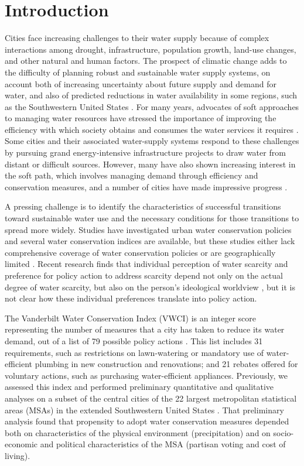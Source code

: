 \documentclass[draft,linenumbers]{agujournal}\usepackage{knitr}
\begin{document}
\section{Introduction}
Cities face increasing challenges to their water supply because of complex
interactions among drought, infrastructure, population growth, land-use changes,
and other natural and human factors.
The prospect of climatic change adds to the difficulty of planning robust and
sustainable water supply systems, on account both of  increasing uncertainty
about future supply and demand for water, and also of predicted reductions in
water availability in some regions, such as the Southwestern United States
\citep{gcrp:natl.assessment.3:2014}.
For many years, advocates of soft approaches to managing water resources have
stressed the importance of improving  the efficiency with which society obtains
and consumes
the water services it requires  \citep{gleick:soft.water.paths:2002}.
Some cities and their associated water-supply systems respond to these
challenges by pursuing grand energy-intensive infrastructure projects to draw
water from distant or difficult sources. However,
many have also shown increasing
interest in the soft path, which involves
managing demand through efficiency and conservation
measures, and a number of cities have made impressive progress
\citep{fleck:fighting:2016}.

A pressing challenge is to identify the characteristics of successful
transitions toward sustainable water use and the necessary conditions for those
transitions to spread more widely.
Studies have investigated urban water conservation policies and several water
conservation indices are available, but these studies either lack comprehensive coverage
of water conservation policies or are geographically limited
\citep{hess:vwci:2017,sauri:conservation:2013,maggioni:conservation:2014}.
Recent research finds that individual perception of water scarcity and
preference for policy action to address scarcity depend not only on the actual
degree of water scarcity, but also on the person's ideological worldview
\citep{switzer:green.lenses:2016}, but it is not clear how these individual
preferences translate into policy action.

The Vanderbilt Water Conservation Index (VWCI) is an integer score representing
the number of measures that a city has taken to reduce its water demand, out of
a list of 79 possible policy actions
\citep{hornberger:hydrological.transitions:2015,hess:drought:2016,hess:vwci:2017}.
This list includes 31 requirements, such as restrictions on
lawn-watering or mandatory use of water-efficient plumbing in new construction
and renovations; and 21 rebates offered for voluntary actions, such
as purchasing water-efficient appliances.
Previously, we assessed this index and performed preliminary quantitative and
qualitative analyses on a subset of the central cities of the 22 largest
metropolitan statistical areas (MSAs) in the extended Southwestern United States
\citep{hess:drought:2016}.
That preliminary analysis found that propensity to
adopt water conservation measures depended both on characteristics
of the physical environment (precipitation) and on socio-economic and political
characteristics of the MSA (partisan voting and cost of living).
\end{document}
